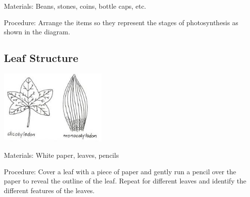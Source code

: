 \begin{multicols}{2}
\begin{description*}
\item[Materials:]{Beans, stones, coins, bottle caps, etc.}
\item[Procedure:]{Arrange the items so they
represent the stages of
photosynthesis as shown in the
diagram.}
\end{description*}

\subsection{Leaf Structure} %

\begin{center}
\includegraphics[width=0.4\textwidth]{./img/vso/leaf-structure.jpg}
\end{center}

\begin{description*}
\item[Materials:]{White paper, leaves, pencils}
\item[Procedure:]{Cover a leaf with a piece of paper and gently run a pencil over the paper to reveal the outline of the leaf. Repeat for different leaves and identify the different features of the leaves.}
\end{description*}


\end{multicols}
